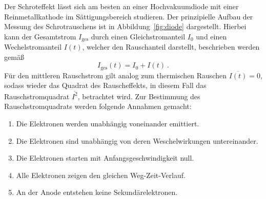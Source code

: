 Der Schroteffekt lässt sich am besten an einer Hochvakuumdiode mit einer
Reinmetallkathode im Sättigungsbereich studieren.
Der prinzipielle Aufbau der Messung des Schrotrauschens ist in
Abbildung~\ref{fig:diode} dargestellt.
Hierbei kann der Gesamtstrom $I_\text{ges}$ durch einen Gleichstromanteil $I_0$
und einen Wechelstromanteil $I(t)$, welcher den Rauschanteil darstellt,
beschrieben werden gemäß
\begin{equation}
  I_\text{ges} (t) = I_0 + I(t)~.
\end{equation}
Für den mittleren Rauschstrom gilt analog zum thermischen Rauschen
$\overline{I(t)} = 0$, sodass wieder das Quadrat des Rauscheffekts, in diesem
Fall das Rauschstromquadrat $\overline{I^2}$, betrachtet wird.
Zur Bestimmung des Rauschstromquadrats werden folgende Annahmen gemacht:
\begin{enumerate}
  \item Die Elektronen werden unabhängig voneinander emittiert.
  \item Die Elektronen sind unabhängig von deren Weschelwirkungen
    untereinander.
  \item Die Elektronen starten mit Anfangsgeschwindigkeit null.
  \item Alle Elektronen zeigen den gleichen Weg-Zeit-Verlauf.
  \item An der Anode entstehen keine Sekundärelektronen.
\end{enumerate}

